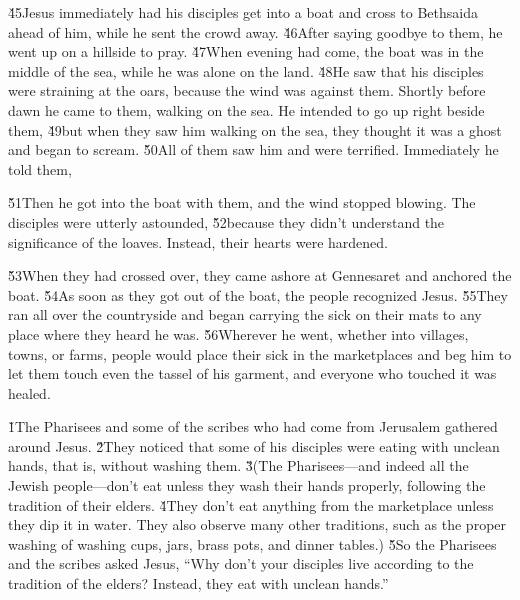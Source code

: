 \v{45}Jesus immediately had his disciples get into a boat and cross to Bethsaida ahead of him, while he sent the crowd away. \v{46}After saying goodbye to them, he went up on a hillside to pray. \v{47}When evening had come, the boat was in the middle of the sea, while he was alone on the land. \v{48}He saw that his disciples were straining at the oars, because the wind was against them. Shortly before dawn he came to them, walking on the sea. He intended to go up right beside them, \v{49}but when they saw him walking on the sea, they thought it was a ghost and began to scream. \v{50}All of them saw him and were terrified. Immediately he told them, 

\v{51}Then he got into the boat with them, and the wind stopped blowing. The disciples were utterly astounded, \v{52}because they didn't understand the significance of the loaves. Instead, their hearts were hardened.

\v{53}When they had crossed over, they came ashore at Gennesaret and anchored the boat. \v{54}As soon as they got out of the boat, the people recognized Jesus. \v{55}They ran all over the countryside and began carrying the sick on their mats to any place where they heard he was. \v{56}Wherever he went, whether into villages, towns, or farms, people would place their sick in the marketplaces and beg him to let them touch even the tassel of his garment, and everyone who touched it was healed.

\v{1}The Pharisees and some of the scribes who had come from Jerusalem gathered around Jesus. \v{2}They noticed that some of his disciples were eating with unclean hands, that is, without washing them. \v{3}(The Pharisees---and indeed all the Jewish people---don't eat unless they wash their hands properly, following the tradition of their elders. \v{4}They don't eat anything from the marketplace unless they dip it in water. They also observe many other traditions, such as the proper washing of washing cups, jars, brass pots, and dinner tables.) \v{5}So the Pharisees and the scribes asked Jesus, ``Why don't your disciples live according to the tradition of the elders? Instead, they eat with unclean hands.''


